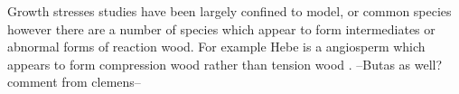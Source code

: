 Growth stresses studies have been largely confined to model, or common species
however there are a number of species which appear to form intermediates or
abnormal forms of reaction wood. For example Hebe is a angiosperm which appears
to form compression wood rather than tension wood \cite{Kojima_2011}. --Butas as well? comment from clemens--